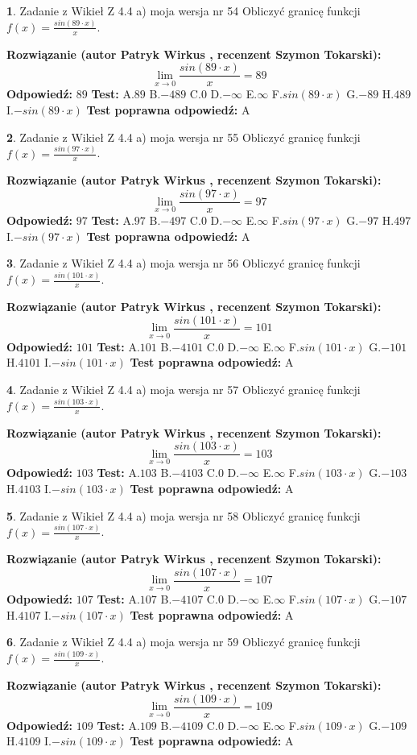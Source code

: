\documentclass[12pt, a4paper]{article}
\theoremstyle{definition} %
\newtheorem{zad}{}
\newcommand{\zadStart}[1]{\begin{zad}#1\newline}
\newcommand{\zadStop}{\end{zad}}
\newcommand{\rozwStart}[2]{\noindent \textbf{Rozwiązanie (autor #1 , recenzent #2): }\newline}
\newcommand{\rozwStop}{\newline}
\newcommand{\odpStart}{\noindent \textbf{Odpowiedź:}\newline}
\newcommand{\odpStop}{\newline}
\newcommand{\testStart}{\noindent \textbf{Test:}\newline}
\newcommand{\testStop}{\newline}
\newcommand{\kluczStart}{\noindent \textbf{Test poprawna odpowiedź:}\newline}
\newcommand{\kluczStop}{\newline}
\begin{document}
\zadStart{Zadanie z Wikieł Z 4.4 a) moja wersja nr 54}
Obliczyć granicę funkcji $f(x)=\frac{sin(89\cdot x)}{x}$.
\zadStop
\rozwStart{Patryk Wirkus}{Szymon Tokarski}
$$\lim\limits_{x\to 0}\frac{sin(89\cdot x)}{x}=
89$$
\rozwStop
\odpStart
$89$
\odpStop
\testStart
A.$89$
B.$-489$
C.$0$
D.$-\infty$
E.$\infty$
F.$sin(89\cdot x)$
G.$-89$
H.$489$
I.$-sin(89\cdot x)$
\testStop
\kluczStart
A
\kluczStop



\zadStart{Zadanie z Wikieł Z 4.4 a) moja wersja nr 55}
Obliczyć granicę funkcji $f(x)=\frac{sin(97\cdot x)}{x}$.
\zadStop
\rozwStart{Patryk Wirkus}{Szymon Tokarski}
$$\lim\limits_{x\to 0}\frac{sin(97\cdot x)}{x}=
97$$
\rozwStop
\odpStart
$97$
\odpStop
\testStart
A.$97$
B.$-497$
C.$0$
D.$-\infty$
E.$\infty$
F.$sin(97\cdot x)$
G.$-97$
H.$497$
I.$-sin(97\cdot x)$
\testStop
\kluczStart
A
\kluczStop



\zadStart{Zadanie z Wikieł Z 4.4 a) moja wersja nr 56}
Obliczyć granicę funkcji $f(x)=\frac{sin(101\cdot x)}{x}$.
\zadStop
\rozwStart{Patryk Wirkus}{Szymon Tokarski}
$$\lim\limits_{x\to 0}\frac{sin(101\cdot x)}{x}=
101$$
\rozwStop
\odpStart
$101$
\odpStop
\testStart
A.$101$
B.$-4101$
C.$0$
D.$-\infty$
E.$\infty$
F.$sin(101\cdot x)$
G.$-101$
H.$4101$
I.$-sin(101\cdot x)$
\testStop
\kluczStart
A
\kluczStop



\zadStart{Zadanie z Wikieł Z 4.4 a) moja wersja nr 57}
Obliczyć granicę funkcji $f(x)=\frac{sin(103\cdot x)}{x}$.
\zadStop
\rozwStart{Patryk Wirkus}{Szymon Tokarski}
$$\lim\limits_{x\to 0}\frac{sin(103\cdot x)}{x}=
103$$
\rozwStop
\odpStart
$103$
\odpStop
\testStart
A.$103$
B.$-4103$
C.$0$
D.$-\infty$
E.$\infty$
F.$sin(103\cdot x)$
G.$-103$
H.$4103$
I.$-sin(103\cdot x)$
\testStop
\kluczStart
A
\kluczStop



\zadStart{Zadanie z Wikieł Z 4.4 a) moja wersja nr 58}
Obliczyć granicę funkcji $f(x)=\frac{sin(107\cdot x)}{x}$.
\zadStop
\rozwStart{Patryk Wirkus}{Szymon Tokarski}
$$\lim\limits_{x\to 0}\frac{sin(107\cdot x)}{x}=
107$$
\rozwStop
\odpStart
$107$
\odpStop
\testStart
A.$107$
B.$-4107$
C.$0$
D.$-\infty$
E.$\infty$
F.$sin(107\cdot x)$
G.$-107$
H.$4107$
I.$-sin(107\cdot x)$
\testStop
\kluczStart
A
\kluczStop



\zadStart{Zadanie z Wikieł Z 4.4 a) moja wersja nr 59}
Obliczyć granicę funkcji $f(x)=\frac{sin(109\cdot x)}{x}$.
\zadStop
\rozwStart{Patryk Wirkus}{Szymon Tokarski}
$$\lim\limits_{x\to 0}\frac{sin(109\cdot x)}{x}=
109$$
\rozwStop
\odpStart
$109$
\odpStop
\testStart
A.$109$
B.$-4109$
C.$0$
D.$-\infty$
E.$\infty$
F.$sin(109\cdot x)$
G.$-109$
H.$4109$
I.$-sin(109\cdot x)$
\testStop
\kluczStart
A
\kluczStop
\end{document}
